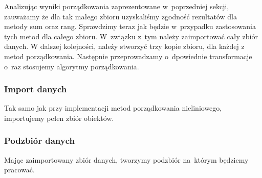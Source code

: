 \documentclass[12pt,a4paper]{report}
\begin{document}
{Analizując wyniki porządkowania zaprezentowane w~poprzedniej sekcji, zauważamy że dla tak małego zbioru uzyskaliśmy zgodność rezultatów dla metody sum oraz rang. Sprawdzimy teraz jak będzie w~przypadku zastosowania tych metod dla całego zbioru. W~związku z~tym należy zaimportować cały zbiór danych. W dalszej kolejności, należy stworzyć trzy kopie zbioru, dla każdej z metod porządkowania. Następnie przeprowadzamy o~dpowiednie transformacje o~raz stosujemy algorytmy porządkowania.
 
\subsubsection{Import danych}
Tak samo jak przy implementacji metod porządkowania nieliniowego, importujemy pełen zbiór obiektów.
\begin{Shaded}
\begin{Highlighting}[]
\StringTok{ }\NormalTok{(}\NormalTok{, }
                            \NormalTok{)}
\end{Highlighting}
\end{Shaded}
\subsubsection{Podzbiór danych}
Mając zaimportowany zbiór danych, tworzymy podzbiór na~którym będziemy pracować. 
\begin{Shaded}
\begin{Highlighting}[]
\NormalTok{dane_porzadkowanie<-zbior_danych[}\NormalTok{(}\NormalTok{,}\NormalTok{,}\NormalTok{,}
                                   \NormalTok{,}
                                   \NormalTok{,}\NormalTok{)]}
\end{Highlighting}
\end{Shaded}
}
\end{document}
